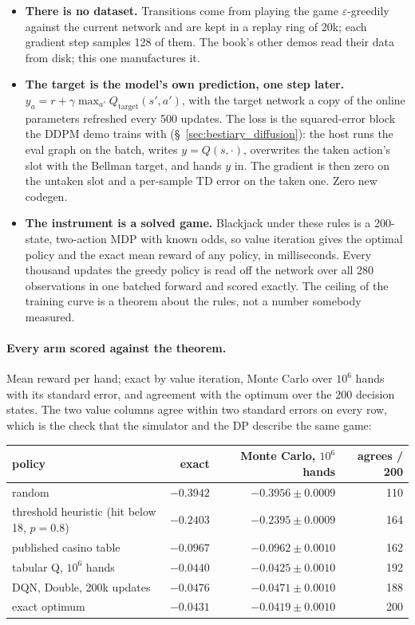 \begin{itemize}
  \item \textbf{There is no dataset.} Transitions come from playing the game
    $\varepsilon$-greedily against the current network and are kept in a
    replay ring of 20k; each gradient step samples 128 of them. The book's
    other demos read their data from disk; this one manufactures it.
  \item \textbf{The target is the model's own prediction, one step later.}
    $y_a = r + \gamma \max_{a'} Q_{\text{target}}(s', a')$, with the target
    network a copy of the online parameters refreshed every 500 updates. The
    loss is the squared-error block the DDPM demo trains with
    (\S~\ref{sec:bestiary_diffusion}): the host runs the eval graph on the
    batch, writes $y = Q(s,\cdot)$, overwrites the taken action's slot with the
    Bellman target, and hands $y$ in. The gradient is then zero on the untaken
    slot and a per-sample TD error on the taken one. Zero new codegen.
  \item \textbf{The instrument is a solved game.} Blackjack under these rules is
    a 200-state, two-action MDP with known odds, so value iteration gives the
    optimal policy and the exact mean reward of any policy, in
    milliseconds. Every thousand updates the greedy policy is read off the
    network over all 280 observations in one batched forward and scored
    exactly. The ceiling of the training curve is a theorem about the rules,
    not a number somebody measured.
\end{itemize}

\paragraph{Every arm scored against the theorem.} Mean reward per hand; exact
by value iteration, Monte Carlo over $10^6$ hands with its standard error,
and agreement with the optimum over the 200 decision states. The two value
columns agree within two standard errors on every row, which is the check that
the simulator and the DP describe the same game:

\begin{center}
\begin{tabular}{@{}l r r r@{}}
\hline
policy & exact & Monte Carlo, $10^6$ hands & agrees / 200 \\
\hline
random                                   & $-0.3942$ & $-0.3956 \pm 0.0009$ & 110 \\
threshold heuristic (hit below 18, $p=0.8$) & $-0.2403$ & $-0.2395 \pm 0.0009$ & 164 \\
published casino table                   & $-0.0967$ & $-0.0962 \pm 0.0010$ & 162 \\
tabular Q, $10^6$ hands                  & $-0.0440$ & $-0.0425 \pm 0.0010$ & 192 \\
DQN, Double, 200k updates                & $-0.0476$ & $-0.0471 \pm 0.0010$ & 188 \\
exact optimum                            & $-0.0431$ & $-0.0419 \pm 0.0010$ & 200 \\
\hline
\end{tabular}
\end{center}

